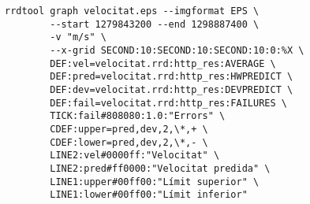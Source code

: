 \begin{lstlisting}
rrdtool graph velocitat.eps --imgformat EPS \
        --start 1279843200 --end 1298887400 \
        -v "m/s" \
        --x-grid SECOND:10:SECOND:10:SECOND:10:0:%X \
        DEF:vel=velocitat.rrd:http_res:AVERAGE \
        DEF:pred=velocitat.rrd:http_res:HWPREDICT \
        DEF:dev=velocitat.rrd:http_res:DEVPREDICT \
        DEF:fail=velocitat.rrd:http_res:FAILURES \
        TICK:fail#808080:1.0:"Errors" \
        CDEF:upper=pred,dev,2,\*,+ \
        CDEF:lower=pred,dev,2,\*,- \
        LINE2:vel#0000ff:"Velocitat" \
        LINE2:pred#ff0000:"Velocitat predida" \
        LINE1:upper#00ff00:"Límit superior" \
        LINE1:lower#00ff00:"Límit inferior" 
\end{lstlisting}


